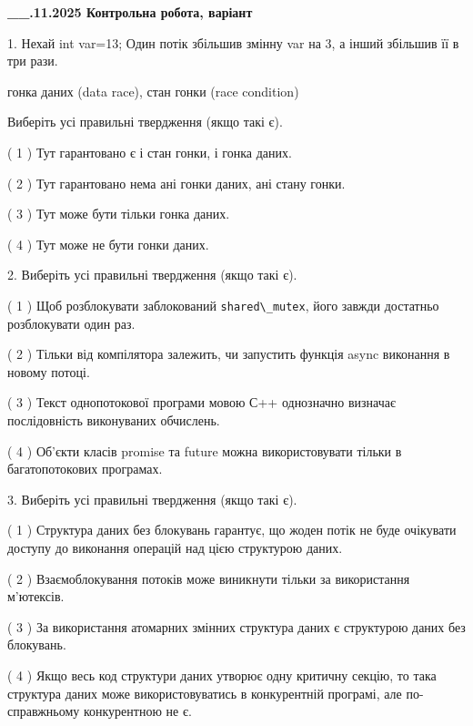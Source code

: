 \documentclass[12pt, ukrainian]{article}
\def\code#1{\Verb!#1!}
\begin{document}
\newpage
\begin {large}

\textbf{\_\_.11.2025 Контрольна робота, варіант  }\par


{
1. Нехай int var=13; Один потік збільшив змінну var на 3, а інший збільшив її в три рази.

гонка даних (data race), стан гонки (race condition)

Виберіть усі правильні твердження (якщо такі є).\par
\vspace{2mm}
( 1 ) Тут гарантовано є і стан гонки, і гонка даних.%

( 2 ) Тут гарантовано нема ані гонки даних, ані стану гонки.%

( 3 ) Тут може бути тільки гонка даних.%

( 4 ) Тут може не бути гонки даних.%


2. Виберіть усі правильні твердження (якщо такі є).\par
\vspace{2mm}

( 1 ) Щоб розблокувати заблокований \code{shared\_mutex}, його завжди достатньо розблокувати один раз.%

( 2 ) Тільки від компілятора залежить, чи запустить функція async виконання в новому потоці.%

( 3 ) Текст однопотокової програми мовою С++ однозначно визначає послідовність виконуваних обчислень.%

( 4 ) Об’єкти класів promise та future можна використовувати тільки в багатопотокових програмах.%


3. Виберіть усі правильні твердження (якщо такі є).\par
\vspace{2mm}

( 1 ) Структура даних без блокувань гарантує, що жоден потік не буде очікувати доступу до виконання операцій над цією структурою даних.%

( 2 ) Взаємоблокування потоків може виникнути тільки за використання м’ютексів.%

( 3 ) За використання атомарних змінних структура даних є структурою даних без блокувань.%

( 4 ) Якщо весь код структури даних утворює одну критичну секцію, то така структура даних може використовуватись в конкурентній програмі, але по-справжньо\-му конкурентною не є.%


}
\end{large}
\end{document}
